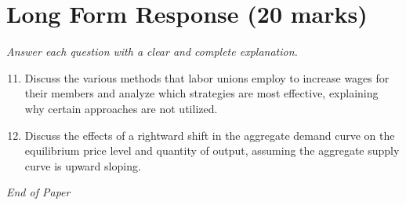 \documentclass[12pt]{article}
\begin{document}
\section*{Long Form Response (20 marks)}
\textit{Answer each question with a clear and complete explanation.}
\begin{enumerate}[label=\arabic*.]
\setcounter{enumi}{10}
\item Discuss the various methods that labor unions employ to increase wages for their members and analyze which strategies are most effective, explaining why certain approaches are not utilized.
\item Discuss the effects of a rightward shift in the aggregate demand curve on the equilibrium price level and quantity of output, assuming the aggregate supply curve is upward sloping.
\end{enumerate}

\vfill
\noindent\textit{End of Paper}
\end{document}
